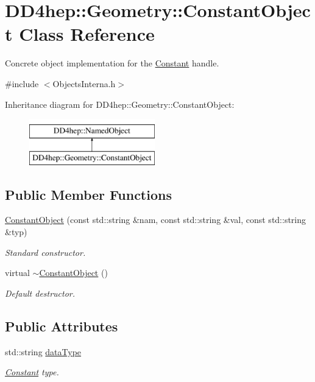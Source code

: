 \hypertarget{class_d_d4hep_1_1_geometry_1_1_constant_object}{}\section{D\+D4hep\+:\+:Geometry\+:\+:Constant\+Object Class Reference}
\label{class_d_d4hep_1_1_geometry_1_1_constant_object}


Concrete object implementation for the \hyperlink{class_d_d4hep_1_1_geometry_1_1_constant}{Constant} handle.  




{\ttfamily \#include $<$Objects\+Interna.\+h$>$}

Inheritance diagram for D\+D4hep\+:\+:Geometry\+:\+:Constant\+Object\+:\begin{figure}[H]
\begin{center}
\leavevmode
\includegraphics[height=2.000000cm]{class_d_d4hep_1_1_geometry_1_1_constant_object}
\end{center}
\end{figure}
\subsection*{Public Member Functions}
\begin{DoxyCompactItemize}
\item 
\hyperlink{class_d_d4hep_1_1_geometry_1_1_constant_object_a9b7d650819776401fea30bc49771cd83}{Constant\+Object} (const std\+::string \&nam, const std\+::string \&val, const std\+::string \&typ)
\begin{DoxyCompactList}\small\item\em Standard constructor. \end{DoxyCompactList}\item 
virtual \hyperlink{class_d_d4hep_1_1_geometry_1_1_constant_object_af524dd1ddcc810be603b62808042d0cb}{$\sim$\+Constant\+Object} ()
\begin{DoxyCompactList}\small\item\em Default destructor. \end{DoxyCompactList}\end{DoxyCompactItemize}
\subsection*{Public Attributes}
\begin{DoxyCompactItemize}
\item 
std\+::string \hyperlink{class_d_d4hep_1_1_geometry_1_1_constant_object_afa7868ea6bab516b7cd63ac1c9537e5c}{data\+Type}
\begin{DoxyCompactList}\small\item\em \hyperlink{class_d_d4hep_1_1_geometry_1_1_constant}{Constant} type. \end{DoxyCompactList}\end{DoxyCompactItemize}
